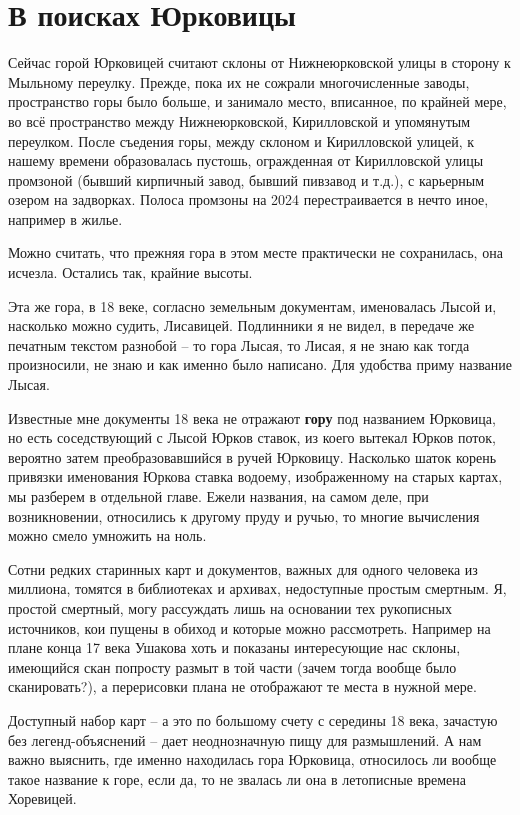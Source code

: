 \chapter{В поисках Юрковицы}

Сейчас горой Юрковицей считают склоны от Нижнеюрковской улицы в сторону к Мыльному переулку. Прежде, пока их не сожрали многочисленные заводы, пространство горы было больше, и занимало место, вписанное, по крайней мере, во всё пространство между Нижнеюрковской, Кирилловской и упомянутым переулком. После съедения горы, между склоном и Кирилловской улицей, к нашему времени образовалась пустошь, огражденная от Кирилловской улицы промзоной (бывший кирпичный завод, бывший пивзавод и т.д.), с карьерным озером на задворках. Полоса промзоны на 2024 перестраивается в нечто иное, например в жилье.

Можно считать, что прежняя гора в этом месте практически не сохранилась, она исчезла. Остались так, крайние высоты.

Эта же гора, в 18 веке, согласно земельным документам, именовалась Лысой и, насколько можно судить, Лисавицей. Подлинники я не видел, в передаче же печатным текстом разнобой – то гора Лысая, то Лисая, я не знаю как тогда произносили, не знаю и как именно было написано. Для удобства приму название Лысая.

Известные мне документы 18 века не отражают \textbf{гору} под названием Юрковица, но есть соседствующий с Лысой Юрков ставок, из коего вытекал Юрков поток, вероятно затем преобразовавшийся в ручей Юрковицу. Насколько шаток корень привязки именования Юркова ставка водоему, изображенному на старых картах, мы разберем в отдельной главе. Ежели названия, на самом деле, при возникновении, относились к другому пруду и ручью, то многие вычисления можно смело умножить на ноль.

Сотни редких старинных карт и документов, важных для одного человека из миллиона, томятся в библиотеках и архивах, недоступные простым смертным. Я, простой смертный, могу рассуждать лишь на основании тех рукописных источников, кои пущены в обиход и которые можно рассмотреть. Например на плане конца 17 века Ушакова хоть и показаны интересующие нас склоны, имеющийся скан попросту размыт в той части (зачем тогда вообще было сканировать?), а перерисовки плана не отображают те места в нужной мере.

Доступный набор карт – а это по большому счету с середины 18 века, зачастую без легенд-объяснений – дает неоднозначную пищу для размышлений. А нам важно выяснить, где именно находилась гора Юрковица, относилось ли вообще такое название к горе, если да, то не звалась ли она в летописные времена Хоревицей.


